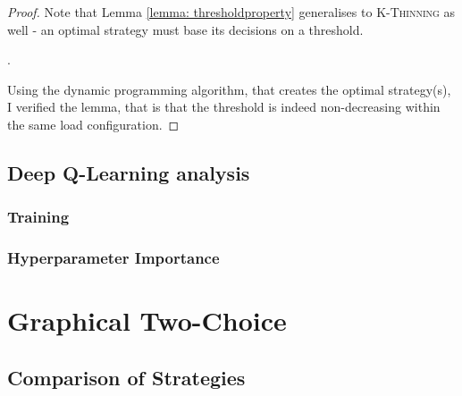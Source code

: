 \begin{proof}
Note that Lemma \ref{lemma: thresholdproperty} generalises to \textsc{K-Thinning} as well - an optimal strategy must base its decisions on a threshold.


.


Using the dynamic programming algorithm, that creates the optimal strategy(s), I verified the lemma, that is that the threshold is indeed non-decreasing within the same load configuration.
\end{proof}


\subsection{Deep Q-Learning analysis}


\subsubsection{Training}


\subsubsection{Hyperparameter Importance}





\section{Graphical Two-Choice}


\subsection{Comparison of Strategies}


